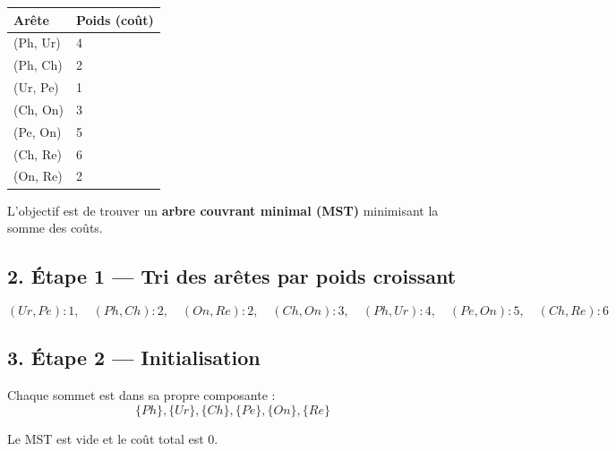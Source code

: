 \begin{center}
\begin{tabular}{ll}
\toprule
Arête & Poids (coût) \\
\midrule
(Ph, Ur) & 4 \\
(Ph, Ch) & 2 \\
(Ur, Pe) & 1 \\
(Ch, On) & 3 \\
(Pe, On) & 5 \\
(Ch, Re) & 6 \\
(On, Re) & 2 \\
\bottomrule
\end{tabular}
\end{center}

L’objectif est de trouver un \textbf{arbre couvrant minimal (MST)} minimisant la somme des coûts.

\subsection*{2. Étape 1 — Tri des arêtes par poids croissant}
\[
(Ur,Pe):1,\quad (Ph,Ch):2,\quad (On,Re):2,\quad (Ch,On):3,\quad (Ph,Ur):4,\quad (Pe,On):5,\quad (Ch,Re):6
\]

\subsection*{3. Étape 2 — Initialisation}

Chaque sommet est dans sa propre composante :  
\[
\{Ph\}, \{Ur\}, \{Ch\}, \{Pe\}, \{On\}, \{Re\}
\]

Le MST est vide et le coût total est \(0\).

